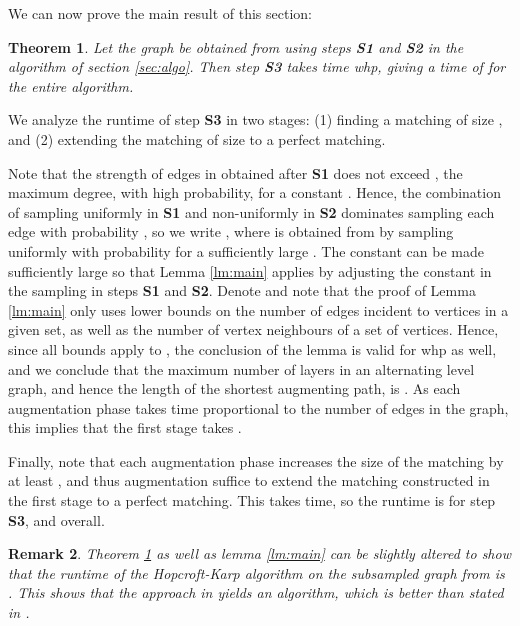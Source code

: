\documentclass[11pt]{article}
\newtheorem{theorem}{Theorem}[section]
\newtheorem{remark}[theorem]{Remark}
\newenvironment{proof}{{\bf Proof:}}{\par}
\begin{document}
We can now prove the main result of this section:
\begin{theorem}\label{thm:runtime}
  Let the graph  be obtained from  using steps \textbf{S1} and
  \textbf{S2} in the algorithm of section \ref{sec:algo}. Then step
  \textbf{S3} takes  time
  whp, giving a time of  for the entire
  algorithm.
\end{theorem}
\begin{proof}
We analyze the runtime of step \textbf{S3} in two stages: (1) finding a matching of size , and (2) extending the matching of size  to a perfect matching.

Note that the strength of edges in  obtained after \textbf{S1} does not exceed , the maximum degree, with high probability, for a constant . Hence, the combination of sampling uniformly in \textbf{S1} and non-uniformly in \textbf{S2} dominates sampling each edge with probability , so we write , where  is obtained from  by sampling uniformly with probability  for a sufficiently large . The constant  can be made sufficiently large so that Lemma \ref{lm:main} applies by adjusting the constant in the sampling in steps \textbf{S1} and \textbf{S2}. Denote  and note that the proof of Lemma \ref{lm:main} only uses lower bounds on the number of edges incident to vertices in a given set, as well as the number of vertex neighbours of a set of vertices. Hence, since all bounds apply to , the conclusion of the lemma is valid for  whp as well, and we conclude that the maximum number of layers in  an alternating level graph, and hence the length of the shortest augmenting path, is . As each augmentation phase takes time proportional to the number of edges in the graph, this implies that the first stage takes .

Finally, note that each augmentation phase increases the size of the matching by at least , and thus  augmentation suffice to extend the matching constructed in the first stage to a perfect matching. This takes  time, so the runtime is  for step \textbf{S3}, and  overall.
\end{proof}

\begin{remark}
Theorem \ref{thm:runtime} as well as lemma \ref{lm:main} can be slightly altered to show that the runtime of the Hopcroft-Karp algorithm on the subsampled graph from \cite{gkk:rbp08} is . This shows that the approach in \cite{gkk:rbp08} yields an  algorithm, which is better than  stated in \cite{gkk:rbp08}.
\end{remark}
\end{document}
